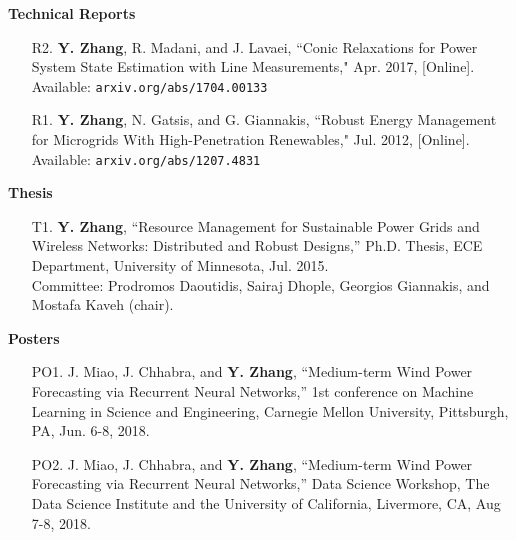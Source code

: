 \documentclass[margin,line]{res}
\begin{document}
\begin{resume}

{\bf Technical Reports}

\vspace{.2cm}

\begin{enumerate}

\item[R2.]	\textbf{Y. Zhang}, R. Madani, and J. Lavaei,
``Conic Relaxations for Power System State Estimation with Line Measurements,"
 Apr. 2017, [Online]. Available: \texttt{arxiv.org/abs/1704.00133}

\item[R1.]	\textbf{Y. Zhang}, N. Gatsis, and G. Giannakis,
``Robust Energy Management for Microgrids With High-Penetration Renewables,"
 Jul. 2012, [Online]. Available: \texttt{arxiv.org/abs/1207.4831}

\end{enumerate}

\vspace{.2cm}

\newpage

{\bf Thesis}

\vspace{.2cm}

\begin{enumerate}


\item[T1.] \textbf{Y. Zhang}, ``Resource Management for Sustainable Power Grids and Wireless Networks: Distributed and Robust Designs,'' Ph.D. Thesis, ECE Department, University of Minnesota, Jul. 2015.\\
    Committee: Prodromos Daoutidis, Sairaj Dhople, Georgios Giannakis, and Mostafa Kaveh (chair).

\end{enumerate}

\vspace{.2cm}


{\bf Posters}

\vspace{.2cm}

\begin{enumerate}
\item[PO1.] J. Miao, J. Chhabra, and \textbf{Y. Zhang}, ``Medium-term Wind Power Forecasting via Recurrent Neural Networks,''
1st conference on Machine Learning in Science and Engineering, Carnegie Mellon University, Pittsburgh, PA, Jun. 6-8, 2018.

\item[PO2.] J. Miao, J. Chhabra, and \textbf{Y. Zhang}, ``Medium-term Wind Power Forecasting via Recurrent Neural Networks,''
Data Science Workshop, The Data Science Institute and the University of California, Livermore, CA, Aug 7-8, 2018.
\end{enumerate}


\end{resume}
\end{document}
